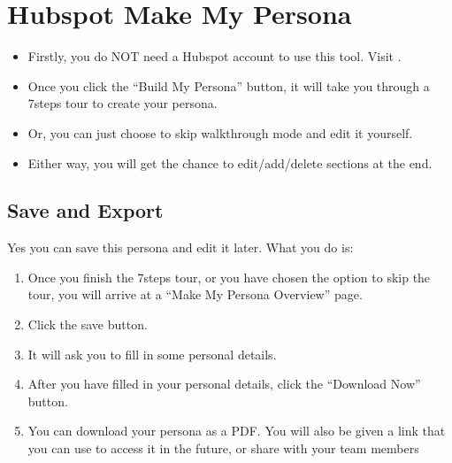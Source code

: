 \documentclass[letterpaper,10pt,english]{jupyterBook}
\begin{document}
\section{Hubspot \sphinxhyphen{} Make My Persona}
\label{\detokenize{appendices/appendix_c/personas_guide:hubspot-make-my-persona}}\begin{itemize}
\item {} 
\sphinxAtStartPar
Firstly, you do NOT need a Hubspot account to use this tool. Visit
.

\item {} 
\sphinxAtStartPar
Once you click the “Build My Persona” button, it will take you through a 7\sphinxhyphen{}steps tour to create your persona.

\item {} 
\sphinxAtStartPar
Or, you can just choose to skip walkthrough mode and edit it yourself.
 

\item {} 
\sphinxAtStartPar
Either way, you will get the chance to edit/add/delete sections at the end.

\end{itemize}


\subsection{Save and Export}
\label{\detokenize{appendices/appendix_c/personas_guide:save-and-export}}
\sphinxAtStartPar
Yes \sphinxhyphen{} you can save this persona and edit it later. What you do is:
\begin{enumerate}
%
\item {} 
\sphinxAtStartPar
Once you finish the 7\sphinxhyphen{}steps tour, or you have chosen the option to skip the tour, you will arrive at a
“Make My Persona Overview” page.

\item {} 
\sphinxAtStartPar
Click the save button.

\item {} 
\sphinxAtStartPar
It will ask you to fill in some personal details.

\item {} 
\sphinxAtStartPar
After you have filled in your personal details, click the “Download Now” button.

\item {} 
\sphinxAtStartPar
You can download your persona as a PDF. You will also be given a link that you can use to access it in the
future, or share with your team members

\end{enumerate}
\end{document}
